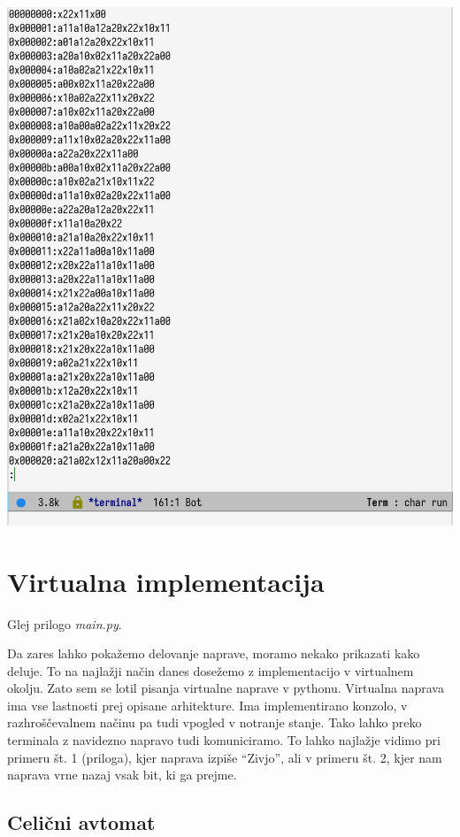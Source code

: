 \documentclass[12pt]{article}
\begin{document}
\begin{center}
  \includegraphics[width=.6\linewidth]{slike/predstavitev/gate-bf.png}
\end{center}

\section{Virtualna implementacija}
Glej prilogo \textit{main.py}.

Da zares lahko pokažemo delovanje naprave, moramo nekako prikazati kako deluje.
To na najlažji način danes dosežemo z implementacijo v virtualnem okolju.
Zato sem se lotil pisanja virtualne naprave v pythonu.
Virtualna naprava ima vse lastnosti prej opisane arhitekture.
Ima implementirano konzolo, v razhroščevalnem načinu pa tudi vpogled v notranje stanje.
Tako lahko preko terminala z navidezno napravo tudi komuniciramo.
To lahko najlažje vidimo pri primeru št. 1 (priloga), kjer naprava izpiše ``Zivjo'', ali v primeru št. 2, kjer nam naprava vrne nazaj vsak bit, ki ga prejme.

\subsection{Celični avtomat}
\end{document}
